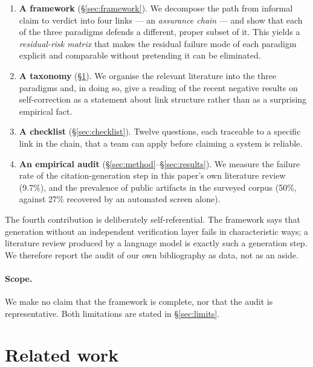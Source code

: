 \documentclass[11pt,a4paper]{article}
\begin{document}
\begin{enumerate}[leftmargin=*,itemsep=2pt]
  \item \textbf{A framework} (\S\ref{sec:framework}). We decompose the path
  from informal claim to verdict into four links --- an \emph{assurance chain}
  --- and show that each of the three paradigms defends a different, proper
  subset of it. This yields a \emph{residual-risk matrix} that makes the
  residual failure mode of each paradigm explicit and comparable without
  pretending it can be eliminated.
  \item \textbf{A taxonomy} (\S\ref{sec:related}). We organise the relevant
  literature into the three paradigms and, in doing so, give a reading of the
  recent negative results on self-correction
  \citep{huang2024selfcorrect,stechly2024selfverification} as a statement about
  link structure rather than as a surprising empirical fact.
  \item \textbf{A checklist} (\S\ref{sec:checklist}). Twelve questions, each
  traceable to a specific link in the chain, that a team can apply before
  claiming a system is reliable.
  \item \textbf{An empirical audit} (\S\ref{sec:method}--\S\ref{sec:results}).
  We measure the failure rate of the citation-generation step in this paper's
  own literature review (9.7\%), and the prevalence of public artifacts in the
  surveyed corpus (50\%, against 27\% recovered by an automated screen alone).
\end{enumerate}

The fourth contribution is deliberately self-referential. The framework says
that generation without an independent verification layer fails in
characteristic ways; a literature review produced by a language model is
exactly such a generation step. We therefore report the audit of our own
bibliography as data, not as an aside.

\paragraph{Scope.} We make no claim that the framework is complete, nor that
the audit is representative. Both limitations are stated in
\S\ref{sec:limits}.

\section{Related work}
\label{sec:related}
\end{document}
